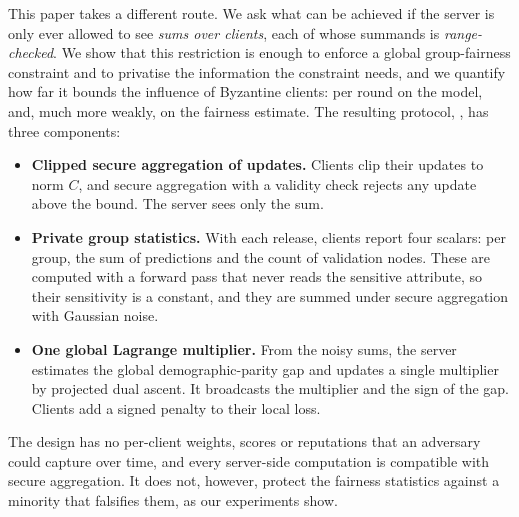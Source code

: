 This paper takes a different route. We ask what can be achieved if the server is only ever allowed to see \emph{sums over clients}, each of whose summands is \emph{range-checked}. We show that this restriction is enough to enforce a global group-fairness constraint and to privatise the information the constraint needs, and we quantify how far it bounds the influence of Byzantine clients: per round on the model, and, much more weakly, on the fairness estimate. The resulting protocol, \clamp{}, has three components:
\begin{itemize}
\item \textbf{Clipped secure aggregation of updates.} Clients clip their updates to norm $C$, and secure aggregation with a validity check rejects any update above the bound. The server sees only the sum.
\item \textbf{Private group statistics.} With each release, clients report four scalars: per group, the sum of predictions and the count of validation nodes. These are computed with a forward pass that never reads the sensitive attribute, so their sensitivity is a constant, and they are summed under secure aggregation with Gaussian noise.
\item \textbf{One global Lagrange multiplier.} From the noisy sums, the server estimates the global demographic-parity gap and updates a single multiplier by projected dual ascent. It broadcasts the multiplier and the sign of the gap. Clients add a signed penalty to their local loss.
\end{itemize}
The design has no per-client weights, scores or reputations that an adversary could capture over time, and every server-side computation is compatible with secure aggregation. It does not, however, protect the fairness statistics against a minority that falsifies them, as our experiments show.

